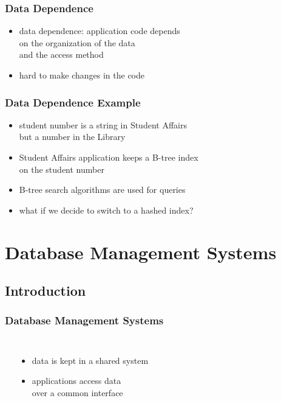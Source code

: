\documentclass[dvipsnames]{beamer}
\theoremstyle{plain}
\begin{document}
\begin{frame}
  \frametitle{Data Dependence}

  \begin{itemize}
    \item \alert{data dependence}: application code depends\\
      on the organization of the data\\
      and the access method

    \medskip
    \item hard to make changes in the code
  \end{itemize}
\end{frame}

\begin{frame}
  \frametitle{Data Dependence Example}

  \begin{itemize}
    \item student number is a string in Student Affairs\\
      but a number in the Library
      
    \medskip
    \item Student Affairs application keeps a B-tree index\\
      on the student number
    \item B-tree search algorithms are used for queries
    \smallskip
    \item what if we decide to switch to a hashed index?
  \end{itemize}
\end{frame}

\section{Database Management Systems}

\subsection{Introduction}

\begin{frame}
  \frametitle{Database Management Systems}

  \begin{columns}[b]
    \begin{center}
    \end{center}

    \begin{itemize}
      \item data is kept in a shared system
      \item applications access data\\
        over a common interface
    \end{itemize}
  \end{columns}
\end{frame}
\end{document}
